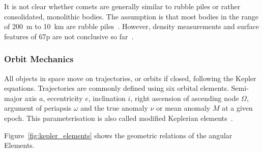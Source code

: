 It is not clear whether comets are generally similar to rubble piles or rather consolidated, monolithic bodies. The assumption is that most bodies in the range of \SI{200}{\meter} to \SI{10}{\kilo\meter} are rubble piles~\cite{Walsh2018RubbleAsteroids}. However, density measurements and surface features of \gls{67p} are not conclusive so far~\cite{Weissman2020OriginNuclei}. 

\subsubsection{Orbit Mechanics} \label{sec:orbit_mechanics}
All objects in space move on trajectories, or orbits if closed, following the Kepler equations. Trajectories are commonly defined using six orbital elements.
Semi-major axis $a$, eccentricity $e$, inclination $i$, right ascension of ascending node $\Omega$, argument of periapsis $\omega$ and the true anomaly $\nu$ or mean anomaly $M$ at a given epoch. This parameterisation is also called modified Keplerian elements~\cite{Hintz2015FundamentalsAstrodynamics}.

Figure~\ref{fig:kepler_elements} shows the geometric relations of the angular Elements.

